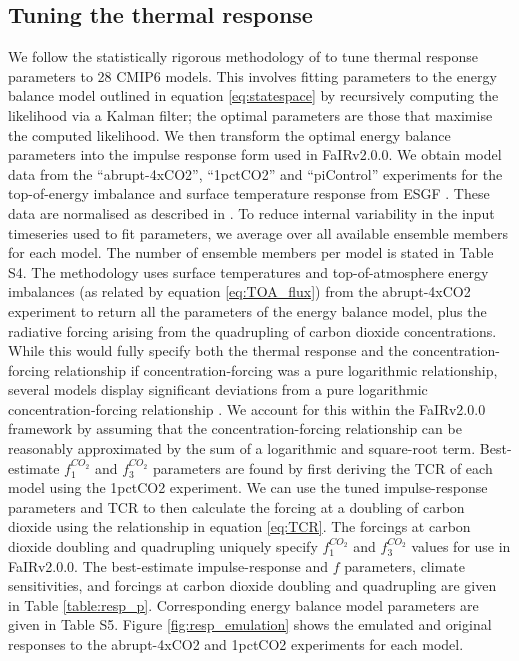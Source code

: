 \documentclass[gmd, manuscript]{copernicus}
\begin{document}
\subsection{Tuning the thermal response} \label{cmip6_response}
We follow the statistically rigorous methodology of \cite{Cummins2020} to tune thermal response parameters to 28 CMIP6 models. This involves fitting parameters to the energy balance model outlined in equation \ref{eq:statespace} by recursively computing the likelihood via a Kalman filter; the optimal parameters are those that maximise the computed likelihood. We then transform the optimal energy balance parameters into the impulse response form used in FaIRv2.0.0. We obtain model data from the ``abrupt-4xCO2'', ``1pctCO2'' and ``piControl'' experiments for the top-of-energy imbalance and surface temperature response from ESGF \citep{Cinquini2014}. These data are normalised as described in \citet{Nicholls2021}. To reduce internal variability in the input timeseries used to fit parameters, we average over all available ensemble members for each model. The number of ensemble members per model is stated in Table S4. The \cite{Cummins2020} methodology uses surface temperatures and top-of-atmosphere energy imbalances (as related by equation \ref{eq:TOA_flux}) from the abrupt-4xCO2 experiment to return all the parameters of the energy balance model, plus the radiative forcing arising from the quadrupling of carbon dioxide concentrations. While this would fully specify both the thermal response and the concentration-forcing relationship if concentration-forcing was a pure logarithmic relationship, several models display significant deviations from a pure logarithmic concentration-forcing relationship \citep{Tsutsui2020,Tsutsui2017}. We account for this within the FaIRv2.0.0 framework by assuming that the concentration-forcing relationship can be reasonably approximated by the sum of a logarithmic and square-root term. Best-estimate $f_1^{CO_2}$ and $f_3^{CO_2}$ parameters are found by first deriving the TCR of each model using the 1pctCO2 experiment. We can use the tuned impulse-response parameters and TCR to then calculate the forcing at a doubling of carbon dioxide using the relationship in equation \ref{eq:TCR}. The forcings at carbon dioxide doubling and quadrupling uniquely specify $f_1^{CO_2}$ and $f_3^{CO_2}$ values for use in FaIRv2.0.0. The best-estimate impulse-response and $f$ parameters, climate sensitivities, and forcings at carbon dioxide doubling and quadrupling are given in Table \ref{table:resp_p}. Corresponding energy balance model parameters are given in Table S5. Figure \ref{fig:resp_emulation} shows the emulated and original responses to the abrupt-4xCO2 and 1pctCO2 experiments for each model.
\end{document}
